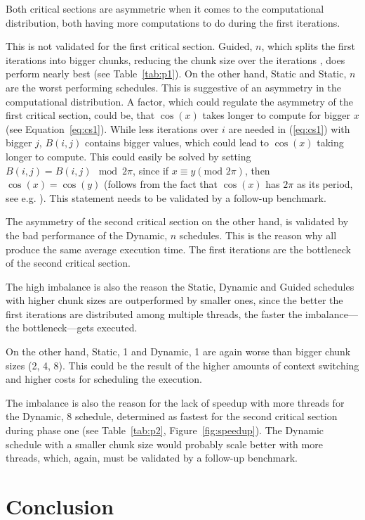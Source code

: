 \documentclass[twoside,11pt]{article}
\begin{document}
Both critical sections are asymmetric when it comes to the
computational distribution, both having more computations
to do during the first iterations.

This is not validated for the first critical section.
Guided, $n$, which splits the first iterations into bigger
chunks, reducing the chunk size over the iterations
\citep[see][]{lecture}, does perform nearly best (see
Table~\ref{tab:p1}).
On the other hand, Static and Static, $n$ are the worst
performing schedules. This is suggestive of an asymmetry
in the computational distribution.
A factor, which could regulate the asymmetry of the
first critical section, could be, that $\cos(x)$ takes
longer to compute for bigger $x$
(see Equation~\ref{eq:cs1}).
While less iterations over $i$ are needed in
(\ref{eq:cs1}) with bigger $j$, $B(i, j)$ contains bigger
values, which could lead to $\cos(x)$ taking longer to
compute.
This could easily be solved by
setting $B(i, j) = B(i, j) \mod 2\pi$, since if
$x \equiv y (\text{mod }2\pi)$, then $\cos(x) = \cos(y)$
(follows from the fact that $\cos(x)$ has $2\pi$ as its
period, see e.g. \citet{trig}).
This statement needs to be validated by a follow-up
benchmark.

The asymmetry of the second critical section on the other
hand, is validated by the bad performance of the Dynamic,
$n$ schedules.
This is the reason why all produce the same average
execution time.
The first iterations are the bottleneck of the second
critical section.

The high imbalance is also the reason the Static, Dynamic
and Guided schedules with higher chunk sizes are
outperformed by smaller ones, since the better the first
iterations are distributed among multiple threads, the
faster the imbalance---the bottleneck---gets executed.

On the other hand, Static, 1 and Dynamic, 1 are again
worse than bigger chunk sizes (2, 4, 8).
This could be the result of the higher amounts of context
switching and higher costs for scheduling the execution.

The imbalance is also the reason for the lack of speedup
with more threads for the Dynamic, 8 schedule, determined
as fastest for the second critical section during phase one
(see Table~\ref{tab:p2}, Figure~\ref{fig:speedup}).
The Dynamic schedule with a smaller chunk size would
probably scale better with more threads, which, again,
must be validated by a follow-up benchmark.


\section{Conclusion} %
\end{document}
